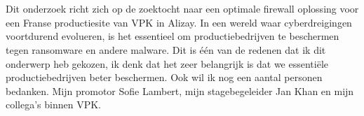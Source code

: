 
\chapter*{}%
\label{ch:voorwoord}

Dit onderzoek richt zich op de zoektocht naar een optimale firewall oplossing voor een Franse productiesite van VPK in Alizay. In een wereld waar cyberdreigingen voortdurend evolueren, is het essentieel om productiebedrijven te beschermen tegen ransomware en andere malware. Dit is één van de redenen dat ik dit onderwerp heb gekozen, ik denk dat het zeer belangrijk is dat we essentiële productiebedrijven beter beschermen.
Ook wil ik nog een aantal personen bedanken. Mijn promotor Sofie Lambert, mijn stagebegeleider Jan Khan en mijn collega's binnen VPK.